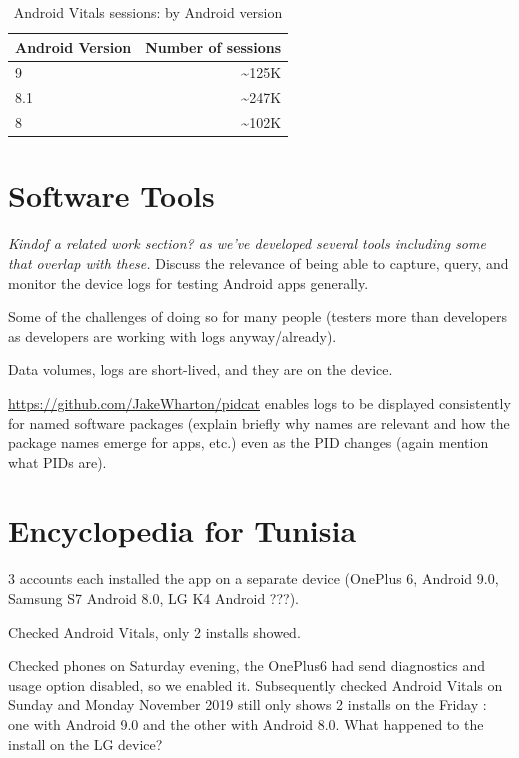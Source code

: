 \begin{table}[]
    \centering
    \begin{tabular}{l|r}
    Android Version &Number of sessions \\
    \hline
    9     &\textasciitilde{}125K \\
    8.1   &\textasciitilde{}247K \\
    8     &\textasciitilde{}102K
    \end{tabular}
    \caption{Android Vitals sessions: by Android version}
    \label{tab:android_vitals_session_counts_by_android_version}
\end{table}

\section{Software Tools}
\emph{Kindof a related work section? as we've developed several tools including some that overlap with these.}
Discuss the relevance of being able to capture, query, and monitor the device logs for testing Android apps generally. 

Some of the challenges of doing so for many people (testers more than developers as developers are working with logs anyway/already).

Data volumes, logs are short-lived, and they are on the device. 

\url{https://github.com/JakeWharton/pidcat} enables logs to be displayed consistently for named software packages (explain briefly why names are relevant and how the package names emerge for apps, etc.) even as the PID changes (again mention what PIDs are).


\section{Encyclopedia for Tunisia}
3 accounts each installed the app on a separate device (OnePlus 6, Android 9.0, Samsung S7 Android 8.0, LG K4 Android ???).

Checked Android Vitals, only 2 installs showed.

Checked phones on Saturday evening, the OnePlus6 had send diagnostics and usage option disabled, so we enabled it. Subsequently checked Android Vitals on Sunday and Monday  November 2019 still only shows 2 installs on the Friday : one with Android 9.0 and the other with Android 8.0. What happened to the install on the LG device?

